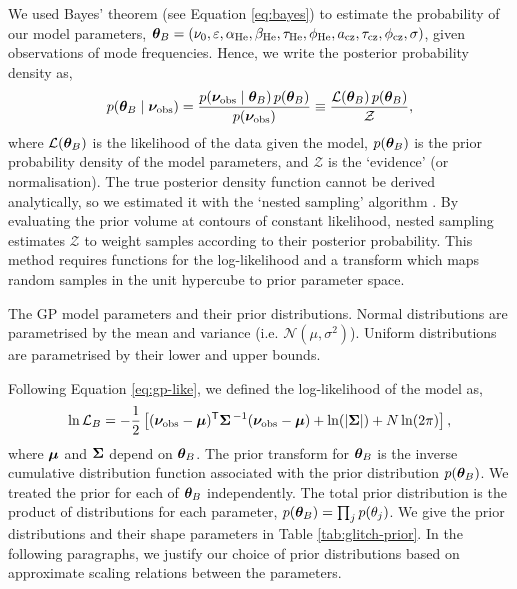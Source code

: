 We used Bayes' theorem (see Equation \ref{eq:bayes}) to estimate the probability of our model parameters, \(\bm{\theta}_B = (\nu_0, \varepsilon, \alpha_{{\mathrm{He}}}, \beta_{{\mathrm{He}}}, \tau_{{\mathrm{He}}}, \phi_{{\mathrm{He}}}, a_{{\mathrm{cz}}}, \tau_{{\mathrm{cz}}}, \phi_{{\mathrm{cz}}}, \sigma)\), given observations of mode frequencies. Hence, we write the posterior probability density as,
%
\begin{equation}
    p(\bm{\theta}_B \mid \bm{\nu}_{{\mathrm{obs}}}) = \frac{p(\bm{\nu}_{{\mathrm{obs}}} \mid \bm{\theta}_B)\,p(\bm{\theta}_B)}{p(\bm{\nu}_{{\mathrm{obs}}})} \equiv \frac{\mathcal{L}(\bm{\theta}_B)\,p(\bm{\theta}_B)}{\mathcal{Z}},
\end{equation}
%
where \(\mathcal{L}(\bm{\theta}_B)\) is the likelihood of the data given the model, \(p(\bm{\theta}_B)\) is the prior probability density of the model parameters, and \(\mathcal{Z}\) is the `evidence' (or normalisation). The true posterior density function cannot be derived analytically, so we estimated it with the `nested sampling' algorithm \citep{Skilling2004}. By evaluating the prior volume at contours of constant likelihood, nested sampling estimates \(\mathcal{Z}\) to weight samples according to their posterior probability. This method requires functions for the log-likelihood and a transform which maps random samples in the unit hypercube to prior parameter space. 

\begin{table}
    \centering
    \caption[The GP model parameters and their prior distributions.]{The GP model parameters and their prior distributions. Normal distributions are parametrised by the mean and variance (i.e. \(\mathcal{N}(\mu,\sigma^2)\)). Uniform distributions are parametrised by their lower and upper bounds.}
    \label{tab:glitch-prior}
    
\end{table}

Following Equation \ref{eq:gp-like}, we defined the log-likelihood of the model as,
%
\begin{equation}
    \ln\mathcal{L}_B = - \frac12 \left[ {(\bm{\nu}_{{\mathrm{obs}}} - \bm{\mu})^\mathsf{T} \bm{\Sigma}^{\,-1} (\bm{\nu}_{{\mathrm{obs}}} - \bm{\mu})} + \ln(| \bm{\Sigma} |) + N\ln(2 \pi) \right],
\end{equation}
%
where \(\bm{\mu}\) and \(\bm{\Sigma}\) depend on \(\bm{\theta}_B\). The prior transform for \(\bm{\theta}_B\) is the inverse cumulative distribution function associated with the prior distribution \(p(\bm{\theta}_B)\). We treated the prior for each of \(\bm{\theta}_B\) independently. The total prior distribution is the product of distributions for each parameter, \(p(\bm{\theta}_B) = \prod_j p(\theta_{j})\). We give the prior distributions and their shape parameters in Table \ref{tab:glitch-prior}. In the following paragraphs, we justify our choice of prior distributions based on approximate scaling relations between the parameters. %

